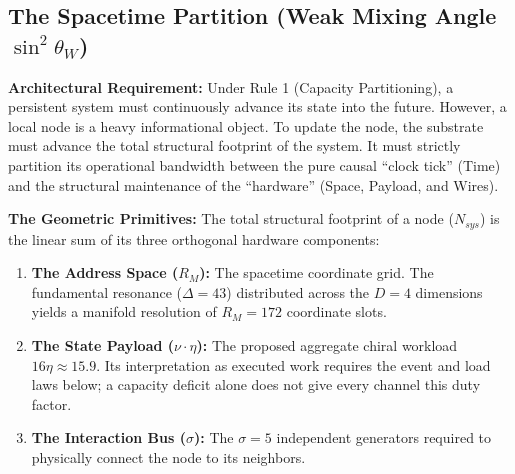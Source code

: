 



\subsection{The Spacetime Partition (Weak Mixing Angle \texorpdfstring{$\sin^2 \theta_W$}{sin2thetaW})}
\label{subsec:spacetime_partition}
\label{subsec:weak_mixing}

\textbf{Architectural Requirement:} Under Rule 1 (Capacity Partitioning), a persistent system must continuously advance its state into the future. However, a local node is a heavy informational object. To update the node, the substrate must advance the total structural footprint of the system. It must strictly partition its operational bandwidth between the pure causal ``clock tick'' (Time) and the structural maintenance of the ``hardware'' (Space, Payload, and Wires). 

\textbf{The Geometric Primitives:} The total structural footprint of a node ($N_{sys}$) is the linear sum of its three orthogonal hardware components:

\begin{enumerate}
    \item \textbf{The Address Space ($R_M$):} The spacetime coordinate grid. The fundamental resonance ($\Delta=43$) distributed across the $D=4$ dimensions yields a manifold resolution of $R_M = 172$ coordinate slots.
    \item \textbf{The State Payload ($\nu \cdot \eta$):} The proposed aggregate chiral workload $16\eta\approx15.9$. Its interpretation as executed work requires the event and load laws below; a capacity deficit alone does not give every channel this duty factor.
    \item \textbf{The Interaction Bus ($\sigma$):} The $\sigma = 5$ independent generators required to physically connect the node to its neighbors.
\end{enumerate}

